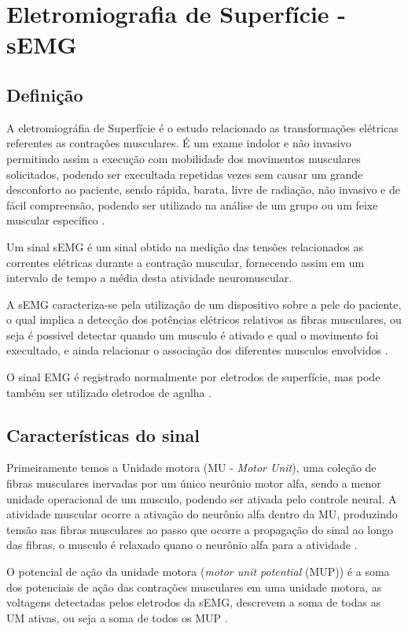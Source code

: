 \chapter{Eletromiografia de Superfície - sEMG}
\section{Definição}
A eletromiográfia de Superfície é o estudo relacionado as transformações elétricas referentes as contrações musculares. É um exame indolor e não invasivo permitindo assim a execução com mobilidade dos movimentos musculares solicitados, podendo ser execultada repetidas vezes sem causar um grande desconforto ao paciente, sendo rápida, barata, livre de radiação, não invasivo e de fácil compreensão, podendo ser utilizado na análise de um grupo ou um feixe muscular específico \cite{de2010eletromiografia}.

Um sinal sEMG é um sinal obtido na medição das tensões relacionados as correntes elétricas durante a contração muscular, fornecendo assim em um intervalo de tempo a média desta atividade neuromuscular\cite{reaz2006techniques}.

A sEMG caracteriza-se pela utilização de um dispositivo sobre a pele do paciente, o qual implica a detecção dos potências elétricos relativos as fibras musculares, ou seja é possivel detectar quando um musculo é ativado e qual o movimento foi execultado, e ainda relacionar o associação dos diferentes musculos envolvidos \cite{botelho2010avaliaccao}.

O sinal EMG é registrado normalmente por eletrodos de superfície, mas pode também ser utilizado eletrodos de agulha \cite{eftaxias2015detection}.

\section{Características do sinal}

Primeiramente temos a Unidade motora (MU - \textit{Motor Unit}), uma coleção de fibras musculares inervadas por um único neurônio motor alfa, sendo a menor unidade operacional de um musculo, podendo ser ativada pelo controle neural. A atividade muscular ocorre a ativação do neurônio alfa dentro da MU, produzindo tensão nas fibras musculares ao passo que ocorre a propagação do sinal ao longo das fibras, o musculo é relaxado quano o neurônio alfa para a atividade \cite{yousefi2014characterizing}.

O potencial de ação da unidade motora (\textit{motor unit potential} (MUP)) é a soma dos potenciais de ação das contrações musculares em uma unidade motora, as voltagens detectadas pelos eletrodos da sEMG, descrevem a soma de todas as UM ativas, ou seja a soma de todos os MUP \cite{yousefi2014characterizing}.

